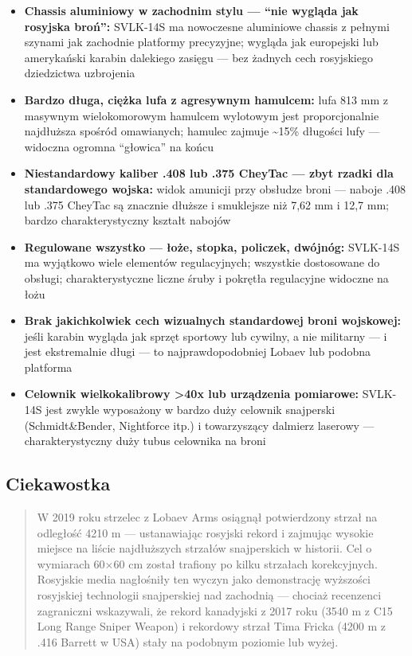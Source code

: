 \documentclass[12pt,oneside]{book}
\providecommand{\tightlist}{%
  \setlength{\itemsep}{0pt}\setlength{\parskip}{0pt}}
\begin{document}
\begin{itemize}
\tightlist
\item
  \textbf{Chassis aluminiowy w zachodnim stylu --- ``nie wygląda jak
  rosyjska broń'':} SVLK-14S ma nowoczesne aluminiowe chassis z pełnymi
  szynami jak zachodnie platformy precyzyjne; wygląda jak europejski lub
  amerykański karabin dalekiego zasięgu --- bez żadnych cech rosyjskiego
  dziedzictwa uzbrojenia
\item
  \textbf{Bardzo długa, ciężka lufa z agresywnym hamulcem:} lufa 813 mm
  z masywnym wielokomorowym hamulcem wylotowym jest proporcjonalnie
  najdłuższa spośród omawianych; hamulec zajmuje \textasciitilde15\%
  długości lufy --- widoczna ogromna ``głowica'' na końcu
\item
  \textbf{Niestandardowy kaliber .408 lub .375 CheyTac --- zbyt rzadki
  dla standardowego wojska:} widok amunicji przy obsłudze broni ---
  naboje .408 lub .375 CheyTac są znacznie dłuższe i smuklejsze niż 7,62
  mm i 12,7 mm; bardzo charakterystyczny kształt nabojów
\item
  \textbf{Regulowane wszystko --- łoże, stopka, policzek, dwójnóg:}
  SVLK-14S ma wyjątkowo wiele elementów regulacyjnych; wszystkie
  dostosowane do obsługi; charakterystyczne liczne śruby i pokrętła
  regulacyjne widoczne na łożu
\item
  \textbf{Brak jakichkolwiek cech wizualnych standardowej broni
  wojskowej:} jeśli karabin wygląda jak sprzęt sportowy lub cywilny, a
  nie militarny --- i jest ekstremalnie długi --- to najprawdopodobniej
  Lobaev lub podobna platforma
\item
  \textbf{Celownik wielkokalibrowy \textgreater40x lub urządzenia
  pomiarowe:} SVLK-14S jest zwykle wyposażony w bardzo duży celownik
  snajperski (Schmidt\&Bender, Nightforce itp.) i towarzyszący dalmierz
  laserowy --- charakterystyczny duży tubus celownika na broni
\end{itemize}

\subsection{Ciekawostka}\label{ciekawostka-82}

\begin{quote}
W 2019 roku strzelec z Lobaev Arms osiągnął potwierdzony strzał na
odległość 4210 m --- ustanawiając rosyjski rekord i zajmując wysokie
miejsce na liście najdłuższych strzałów snajperskich w historii. Cel o
wymiarach 60×60 cm został trafiony po kilku strzałach korekcyjnych.
Rosyjskie media nagłośniły ten wyczyn jako demonstrację wyższości
rosyjskiej technologii snajperskiej nad zachodnią --- chociaż recenzenci
zagraniczni wskazywali, że rekord kanadyjski z 2017 roku (3540 m z C15
Long Range Sniper Weapon) i rekordowy strzał Tima Fricka (4200 m z .416
Barrett w USA) stały na podobnym poziomie lub wyżej.
\end{quote}
\end{document}
